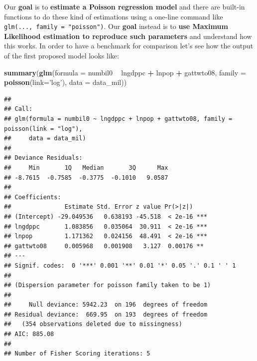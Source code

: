 \documentclass[]{book}
\newenvironment{Shaded}{\begin{snugshade}}{\end{snugshade}}
\newcommand{\KeywordTok}[1]{\textcolor[rgb]{0.13,0.29,0.53}{\textbf{#1}}}
\newcommand{\DataTypeTok}[1]{\textcolor[rgb]{0.13,0.29,0.53}{#1}}
\newcommand{\DecValTok}[1]{\textcolor[rgb]{0.00,0.00,0.81}{#1}}
\newcommand{\StringTok}[1]{\textcolor[rgb]{0.31,0.60,0.02}{#1}}
\newcommand{\OperatorTok}[1]{\textcolor[rgb]{0.81,0.36,0.00}{\textbf{#1}}}
\newcommand{\NormalTok}[1]{#1}
\begin{document}
\begin{Shaded}
\end{Shaded}

Our \textbf{goal} is to \textbf{estimate a Poisson regression model} and
there are built-in functions to do these kind of estimations using a
one-line command like \texttt{glm(...,\ family\ =\ "poisson")}. Our
\textbf{goal} instead is to \textbf{use Maximum Likelihood estimation to
reproduce such parameters} and understand how this works. In order to
have a benchmark for comparison let's see how the output of the first
proposed model looks like:

\begin{Shaded}
\begin{Highlighting}[]
\KeywordTok{summary}\NormalTok{(}\KeywordTok{glm}\NormalTok{(}\DataTypeTok{formula =}\NormalTok{ numbil0 }\OperatorTok{~}\StringTok{ }\NormalTok{lngdppc }\OperatorTok{+}\StringTok{ }\NormalTok{lnpop }\OperatorTok{+}\StringTok{ }\NormalTok{gattwto08, }\DataTypeTok{family =} \KeywordTok{poisson}\NormalTok{(}\DataTypeTok{link=}\StringTok{'log'}\NormalTok{), }\DataTypeTok{data =}\NormalTok{ data_mil))}
\end{Highlighting}
\end{Shaded}

\begin{verbatim}
## 
## Call:
## glm(formula = numbil0 ~ lngdppc + lnpop + gattwto08, family = poisson(link = "log"), 
##     data = data_mil)
## 
## Deviance Residuals: 
##     Min       1Q   Median       3Q      Max  
## -8.7615  -0.7585  -0.3775  -0.1010   9.0587  
## 
## Coefficients:
##               Estimate Std. Error z value Pr(>|z|)    
## (Intercept) -29.049536   0.638193 -45.518  < 2e-16 ***
## lngdppc       1.083856   0.035064  30.911  < 2e-16 ***
## lnpop         1.171362   0.024156  48.491  < 2e-16 ***
## gattwto08     0.005968   0.001908   3.127  0.00176 ** 
## ---
## Signif. codes:  0 '***' 0.001 '**' 0.01 '*' 0.05 '.' 0.1 ' ' 1
## 
## (Dispersion parameter for poisson family taken to be 1)
## 
##     Null deviance: 5942.23  on 196  degrees of freedom
## Residual deviance:  669.95  on 193  degrees of freedom
##   (354 observations deleted due to missingness)
## AIC: 885.08
## 
## Number of Fisher Scoring iterations: 5
\end{verbatim}
\end{document}
